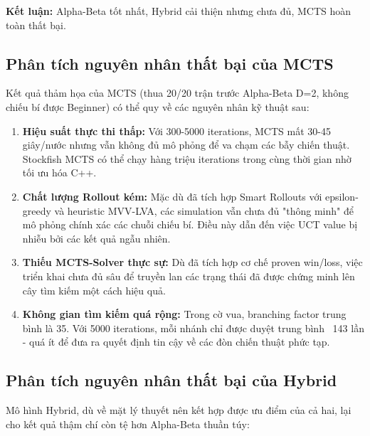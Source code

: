 \textbf{Kết luận:} Alpha-Beta tốt nhất, Hybrid cải thiện nhưng chưa đủ, MCTS hoàn toàn thất bại.

\subsection{Phân tích nguyên nhân thất bại của MCTS}

Kết quả thảm họa của MCTS (thua 20/20 trận trước Alpha-Beta D=2, không chiếu bí được Beginner) có thể quy về các nguyên nhân kỹ thuật sau:

\begin{enumerate}
    \item \textbf{Hiệu suất thực thi thấp:} Với 300-5000 iterations, MCTS mất 30-45 giây/nước nhưng vẫn không đủ mô phỏng để va chạm các bẫy chiến thuật. Stockfish MCTS có thể chạy hàng triệu iterations trong cùng thời gian nhờ tối ưu hóa C++.
    
    \item \textbf{Chất lượng Rollout kém:} Mặc dù đã tích hợp Smart Rollouts với epsilon-greedy và heuristic MVV-LVA, các simulation vẫn chưa đủ "thông minh" để mô phỏng chính xác các chuỗi chiếu bí. Điều này dẫn đến việc UCT value bị nhiễu bởi các kết quả ngẫu nhiên.
    
    \item \textbf{Thiếu MCTS-Solver thực sự:} Dù đã tích hợp cơ chế proven win/loss, việc triển khai chưa đủ sâu để truyền lan các trạng thái đã được chứng minh lên cây tìm kiếm một cách hiệu quả.
    
    \item \textbf{Không gian tìm kiếm quá rộng:} Trong cờ vua, branching factor trung bình là 35. Với 5000 iterations, mỗi nhánh chỉ được duyệt trung bình ~143 lần - quá ít để đưa ra quyết định tin cậy về các đòn chiến thuật phức tạp.
\end{enumerate}

\subsection{Phân tích nguyên nhân thất bại của Hybrid}

Mô hình Hybrid, dù về mặt lý thuyết nên kết hợp được ưu điểm của cả hai, lại cho kết quả thậm chí còn tệ hơn Alpha-Beta thuần túy:

